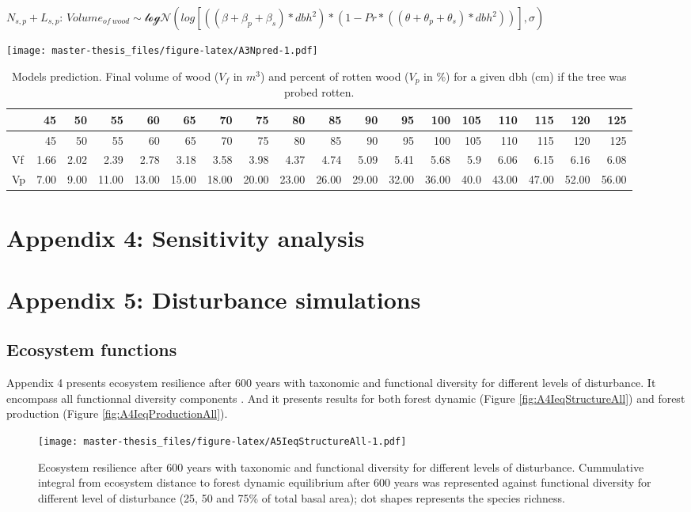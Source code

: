\documentclass[12pt,]{article}
\let\oldsection\section
\renewcommand\section{\newpage\oldsection}
\theoremstyle{definition}
\theoremstyle{definition}
\theoremstyle{remark}
\begin{document}
\(N_{s,p} + L_{s,p}\):
\(Volume_{of~wood} \sim \mathcal{logN} (log[((\beta + \beta_p + \beta_s)*dbh^2)*(1 - Pr*((\theta + \theta_p + \theta_s) *dbh^2))], \sigma)\)

\texttt{[image: master-thesis\_files/figure-latex/A3Npred-1.pdf]}

\begin{longtable}[]{@{}lrrrrrrrrrrrrrrrrr@{}}
\caption{\label{tab:A3Ntab}Models prediction. Final volume of wood (\(V_f\)
in \(m^3\)) and percent of rotten wood (\(V_p\) in \%) for a given dbh
(cm) if the tree was probed rotten.}\tabularnewline
\toprule
& 45 & 50 & 55 & 60 & 65 & 70 & 75 & 80 & 85 & 90 & 95 & 100 & 105 & 110
& 115 & 120 & 125\tabularnewline
\midrule
\endfirsthead
\toprule
& 45 & 50 & 55 & 60 & 65 & 70 & 75 & 80 & 85 & 90 & 95 & 100 & 105 & 110
& 115 & 120 & 125\tabularnewline
\midrule
\endhead
Vf & 1.66 & 2.02 & 2.39 & 2.78 & 3.18 & 3.58 & 3.98 & 4.37 & 4.74 & 5.09
& 5.41 & 5.68 & 5.9 & 6.06 & 6.15 & 6.16 & 6.08\tabularnewline
Vp & 7.00 & 9.00 & 11.00 & 13.00 & 15.00 & 18.00 & 20.00 & 23.00 & 26.00
& 29.00 & 32.00 & 36.00 & 40.0 & 43.00 & 47.00 & 52.00 &
56.00\tabularnewline
\bottomrule
\end{longtable}

\section{Appendix 4: Sensitivity
analysis}\label{appendix-4-sensitivity-analysis}

\hypertarget{appendix-5-disturbance-simulations}{\section{Appendix 5:
Disturbance simulations}\label{appendix-5-disturbance-simulations}}

\subsection{Ecosystem functions}\label{ecosystem-functions-2}

Appendix 4 presents ecosystem resilience after 600 years with taxonomic
and functional diversity for different levels of disturbance. It
encompass all functionnal diversity components \citep[FRIC, FEve, FDiv,
and FDis,][]{villeger_new_2008}. And it presents results for both forest
dynamic (Figure \ref{fig:A4IeqStructureAll}) and forest production
(Figure \ref{fig:A4IeqProductionAll}).

\begin{figure}[htbp]
\centering
\texttt{[image: master-thesis\_files/figure-latex/A5IeqStructureAll-1.pdf]}
\caption{\label{fig:A5IeqStructureAll}Ecosystem resilience after 600 years
with taxonomic and functional diversity for different levels of
disturbance. Cummulative integral from ecosystem distance to forest
dynamic equilibrium after 600 years was represented against functional
diversity \citep[FRIC, FEve, FDiv, and FDis,][]{villeger_new_2008} for
different level of disturbance (25, 50 and 75\% of total basal area);
dot shapes represents the species richness.}
\end{figure}
\end{document}
